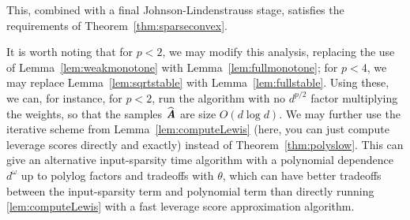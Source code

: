 This, combined with a final Johnson-Lindenstrauss stage, satisfies the requirements of Theorem~\ref{thm:sparseconvex}.

It is worth noting that for $p < 2$, we may modify this analysis, replacing the use of Lemma~\ref{lem:weakmonotone} with
Lemma~\ref{lem:fullmonotone}; for $p < 4$, we may replace Lemma~\ref{lem:sqrtstable} with
Lemma~\ref{lem:fullstable}.  Using these, we can, for instance, for $p < 2$, run the algorithm with no $d^{p/2}$ factor
multiplying the weights, so that the samples $\widehat \AA$ are size $O(d \log d)$.  We may further use the iterative scheme
from Lemma~\ref{lem:computeLewis} (here, you can just compute leverage scores directly and exactly) instead of
Theorem~\ref{thm:polyslow}.  This can give an alternative input-sparsity time algorithm with a polynomial dependence $d^{\omega}$
up to polylog factors and tradeoffs with $\theta$, which can have better tradeoffs between the input-sparsity term
and polynomial term than directly running \ref{lem:computeLewis} with a fast leverage score approximation algorithm.
